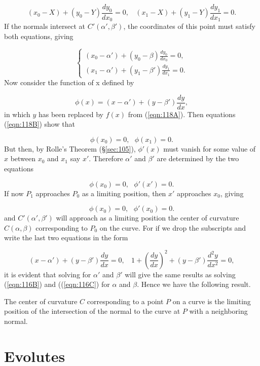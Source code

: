 \[
    (x_0 - X) + (y_0 - Y) \frac{dy_0}{dx_0} = 0,
\ \ \ \ 
    (x_1 - X) + (y_1 - Y) \frac{dy_1}{dx_1} = 0.
\]
If the normals intersect at $C'(\alpha',\beta')$, the 
coordinates of this point must satisfy both equations, giving

\begin{equation}
\label{eqn:118B}
\begin{cases}
(x_0 - \alpha') + (y_0 - \beta) \frac{dy_0}{dx_0} = 0, \\ 
(x_1 - \alpha') + (y_1 - \beta') \frac{dy_1}{dx_1} = 0.
\end{cases}
\end{equation}
Now consider the function of x defined by

\[
    \phi(x) = (x - \alpha') + (y - \beta') \frac{dy}{dx},
\]
in which $y$ has been replaced by $f(x)$ from (\ref{eqn:118A}).
Then equations (\ref{eqn:118B}) show that

\[
\phi(x_0) = 0,\ \ \ \phi(x_1) = 0.
\]
But then, by Rolle's Theorem (\S \ref{sec:105}), 
$\phi'(x)$ must vanish for some value of $x$ between $x_0$ and 
$x_1$ say $x'$. Therefore $\alpha'$ and $\beta'$ are determined by the 
two equations

\[
\phi(x_0) = 0,\ \ \ \phi'(x') = 0.
\]
If now $P_1$ approaches $P_0$ as a limiting position, then 
$x'$ approaches $x_0$, giving

\[
\phi(x_0) = 0,\ \ \ \phi'(x_0) = 0.
\]  
and $C'(\alpha',\beta')$ will approach as a limiting position 
the center of curvature $C(\alpha,\beta)$ corresponding to 
$P_0$ on the curve. For if we drop the subscripts and write 
the last two equations in the form

\[
    (x - \alpha') + (y - \beta') \frac{dy}{dx} = 0,
\ \ \ \ 
1 + \left( \frac{dy}{dx} \right)^2 + (y - \beta') \frac{d^2 y}{dx^2} = 0,
\]
it is evident that solving for $\alpha'$ and $\beta'$ will 
give the same results as solving (\ref{eqn:116B}) and 
((\ref{eqn:116C}) for $\alpha$ and $\beta$. Hence we have the following 
result.

\begin{theorem}
The center of curvature $C$ corresponding to a point $P$ on a curve 
is the limiting position of the intersection of the normal 
to the curve at $P$ with a neighboring normal.
\end{theorem}


\section{Evolutes}
\label{sec:119}

